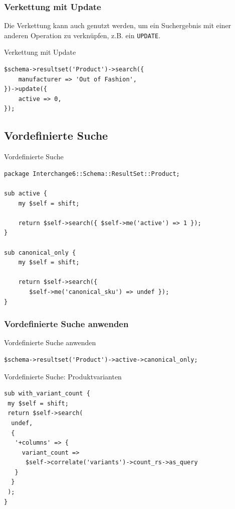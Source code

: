 \subsubsection{Verkettung mit Update}

Die Verkettung kann auch genutzt werden, um
ein Suchergebnis mit einer anderen Operation zu
verknüpfen, z.B. ein \verb|UPDATE|.

\begin{frame}[fragile]{Verkettung mit Update}
\begin{lstlisting}
$schema->resultset('Product')->search({
    manufacturer => 'Out of Fashion',
})->update({
    active => 0,
});
\end{lstlisting}
\end{frame}

\subsection{Vordefinierte Suche}

\begin{frame}[fragile]{Vordefinierte Suche}
\begin{lstlisting}
package Interchange6::Schema::ResultSet::Product;

sub active {
    my $self = shift;

    return $self->search({ $self->me('active') => 1 });
}

sub canonical_only {
    my $self = shift;

    return $self->search({ 
       $self->me('canonical_sku') => undef });
}

\end{lstlisting}
\end{frame}

\subsubsection{Vordefinierte Suche anwenden}

\begin{frame}[fragile]{Vordefinierte Suche anwenden}
\begin{lstlisting}
$schema->resultset('Product')->active->canonical_only;
\end{lstlisting}
\end{frame}

\begin{frame}[fragile]{Vordefinierte Suche: Produktvarianten}
\begin{lstlisting}
sub with_variant_count {
 my $self = shift;
 return $self->search(
  undef,
  {
   '+columns' => {
     variant_count =>
      $self->correlate('variants')->count_rs->as_query
   }
  }
 );
}
\end{lstlisting}
\end{frame}

